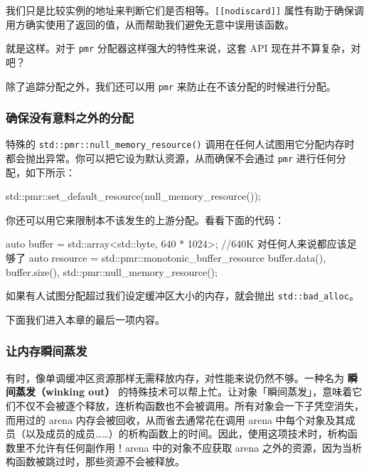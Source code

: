 我们只是比较实例的地址来判断它们是否相等。\texttt{[[nodiscard]]} 属性有助于确保调用方确实使用了返回的值，从而帮助我们避免无意中误用该函数。

\label{idx:623}
就是这样。对于 \texttt{pmr} 分配器这样强大的特性来说，这套 API 现在并不算复杂，对吧？

除了追踪分配之外，我们还可以用 \texttt{pmr} 来防止在不该分配的时候进行分配。

\subsubsection{确保没有意料之外的分配}

\label{idx:624}
特殊的 \texttt{std::\allowbreak{}pmr::\allowbreak{}null\_\allowbreak{}memory\_\allowbreak{}resource(\allowbreak{})\allowbreak{}} 调用在任何人试图用它分配内存时都会抛出异常。你可以把它设为默认资源，从而确保不会通过 \texttt{pmr} 进行任何分配，如下所示：

\begin{codebox}[cpp]
std::pmr::set_default_resource(null_memory_resource());
\end{codebox}

你还可以用它来限制本不该发生的上游分配。看看下面的代码：

\begin{codebox}[cpp]
auto buffer = std::array<std::byte, 640 * 1024>{}; //640K 对任何人来说都应该足够了
auto resource = std::pmr::monotonic_buffer_resource{
    buffer.data(), buffer.size(), std::pmr::null_memory_resource()};
\end{codebox}

如果有人试图分配超过我们设定缓冲区大小的内存，就会抛出 \texttt{std::\allowbreak{}bad\_\allowbreak{}alloc}。

下面我们进入本章的最后一项内容。

\subsubsection{让内存瞬间蒸发}

\label{idx:625}
\label{idx:626}
有时，像单调缓冲区资源那样无需释放内存，对性能来说仍然不够。一种名为 \textbf{瞬间蒸发（winking out）} 的特殊技术可以帮上忙。让对象「瞬间蒸发」，意味着它们不仅不会被逐个释放，连析构函数也不会被调用。所有对象会一下子凭空消失，而用过的 arena 内存会被回收，从而省去通常花在调用 arena 中每个对象及其成员（以及成员的成员……）的析构函数上的时间。因此，使用这项技术时，析构函数里不允许有任何副作用！arena 中的对象不应获取 arena 之外的资源，因为当析构函数被跳过时，那些资源不会被释放。


